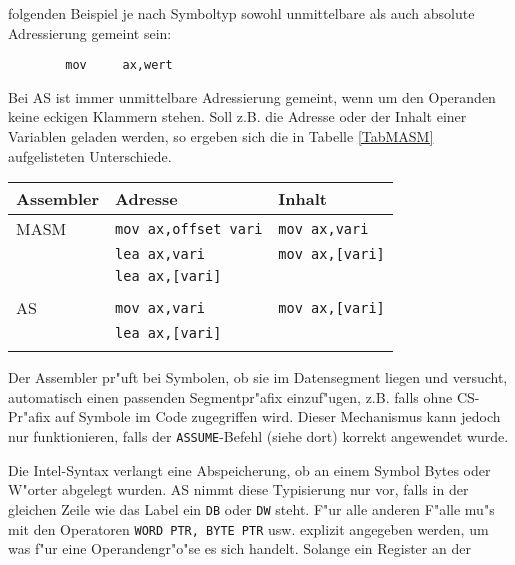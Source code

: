 \documentclass[12pt,a4paper,twoside]{report}
\newcommand{\tty}[1]{{\tt #1}}
\begin{document}
{folgenden Beispiel je nach Symboltyp sowohl unmittelbare als auch absolute
Adressierung gemeint sein:
\begin{verbatim}
        mov     ax,wert
\end{verbatim}
Bei AS ist immer unmittelbare Adressierung gemeint, wenn um den Operanden
keine eckigen Klammern stehen.  Soll z.B. die Adresse oder der Inhalt einer
Variablen geladen werden, so ergeben sich die in Tabelle \ref{TabMASM}
aufgelisteten Unterschiede.
\begin{table*}
\begin{center}\begin{tabular}{|l|l|l|}
\hline
Assembler  & Adresse                  & Inhalt                 \\
\hline
\hline
MASM       & \tty{mov ax,offset vari} & \tty{mov ax,vari}      \\
           & \tty{lea ax,vari}        & \tty{mov ax,[vari]}    \\
           & \tty{lea ax,[vari]}      &                        \\
           &                          &                        \\
AS         & \tty{mov ax,vari}        & \tty{mov ax,[vari]}    \\
           & \tty{lea ax,[vari]}      &                        \\
           &                          &                        \\
\hline
\end{tabular}\end{center}
\caption{Unterschiede in der Adressierungssyntax AS$\leftrightarrow$MASM\label{TabMASM}}
\normalsize
\end{table*}
\par
Der Assembler pr"uft bei Symbolen, ob sie im Datensegment liegen und
versucht, automatisch einen passenden Segmentpr"afix einzuf"ugen, z.B.
falls ohne CS-Pr"afix auf Symbole im Code zugegriffen wird.  Dieser
Mechanismus kann jedoch nur funktionieren, falls der \tty{ASSUME}-Befehl 
(siehe dort) korrekt angewendet wurde.
\par
Die Intel-Syntax verlangt eine Abspeicherung, ob an einem Symbol Bytes oder
W"orter abgelegt wurden.  AS nimmt diese Typisierung nur vor, falls in der
gleichen Zeile wie das Label ein \tty{DB} oder \tty{DW} steht.  F"ur alle anderen F"alle
mu"s mit den Operatoren \tty{WORD PTR, BYTE PTR} usw. explizit angegeben werden, 
um was f"ur eine Operandengr"o"se es sich handelt.  Solange ein Register an der
}
\end{document}
